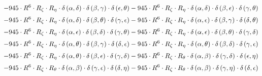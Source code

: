 \begin{subequations}
\begin{gather}
 \\[0.2em] \notag 		 - 945 \cdot R^{6} \cdot R_{\zeta{}} \cdot R_{\eta{}} \cdot \delta{}\left(\alpha{}, \delta{}\right) \cdot \delta{}\left(\beta{}, \gamma{}\right) \cdot \delta{}\left(\epsilon{}, \theta{}\right)- 945 \cdot R^{6} \cdot R_{\zeta{}} \cdot R_{\eta{}} \cdot \delta{}\left(\alpha{}, \delta{}\right) \cdot \delta{}\left(\beta{}, \epsilon{}\right) \cdot \delta{}\left(\gamma{}, \theta{}\right) 
 \\[0.2em] \notag 		 - 945 \cdot R^{6} \cdot R_{\zeta{}} \cdot R_{\eta{}} \cdot \delta{}\left(\alpha{}, \delta{}\right) \cdot \delta{}\left(\beta{}, \theta{}\right) \cdot \delta{}\left(\gamma{}, \epsilon{}\right)- 945 \cdot R^{6} \cdot R_{\zeta{}} \cdot R_{\eta{}} \cdot \delta{}\left(\alpha{}, \epsilon{}\right) \cdot \delta{}\left(\beta{}, \gamma{}\right) \cdot \delta{}\left(\delta{}, \theta{}\right) 
 \\[0.2em] \notag 		 - 945 \cdot R^{6} \cdot R_{\zeta{}} \cdot R_{\eta{}} \cdot \delta{}\left(\alpha{}, \epsilon{}\right) \cdot \delta{}\left(\beta{}, \delta{}\right) \cdot \delta{}\left(\gamma{}, \theta{}\right)- 945 \cdot R^{6} \cdot R_{\zeta{}} \cdot R_{\eta{}} \cdot \delta{}\left(\alpha{}, \epsilon{}\right) \cdot \delta{}\left(\beta{}, \theta{}\right) \cdot \delta{}\left(\gamma{}, \delta{}\right) 
 \\[0.2em] \notag 		 - 945 \cdot R^{6} \cdot R_{\zeta{}} \cdot R_{\eta{}} \cdot \delta{}\left(\alpha{}, \theta{}\right) \cdot \delta{}\left(\beta{}, \gamma{}\right) \cdot \delta{}\left(\delta{}, \epsilon{}\right)- 945 \cdot R^{6} \cdot R_{\zeta{}} \cdot R_{\eta{}} \cdot \delta{}\left(\alpha{}, \theta{}\right) \cdot \delta{}\left(\beta{}, \delta{}\right) \cdot \delta{}\left(\gamma{}, \epsilon{}\right) 
 \\[0.2em] \notag 		 - 945 \cdot R^{6} \cdot R_{\zeta{}} \cdot R_{\eta{}} \cdot \delta{}\left(\alpha{}, \theta{}\right) \cdot \delta{}\left(\beta{}, \epsilon{}\right) \cdot \delta{}\left(\gamma{}, \delta{}\right)- 945 \cdot R^{6} \cdot R_{\zeta{}} \cdot R_{\theta{}} \cdot \delta{}\left(\alpha{}, \beta{}\right) \cdot \delta{}\left(\gamma{}, \delta{}\right) \cdot \delta{}\left(\epsilon{}, \eta{}\right) 
 \\[0.2em] \notag 		 - 945 \cdot R^{6} \cdot R_{\zeta{}} \cdot R_{\theta{}} \cdot \delta{}\left(\alpha{}, \beta{}\right) \cdot \delta{}\left(\gamma{}, \epsilon{}\right) \cdot \delta{}\left(\delta{}, \eta{}\right)- 945 \cdot R^{6} \cdot R_{\zeta{}} \cdot R_{\theta{}} \cdot \delta{}\left(\alpha{}, \beta{}\right) \cdot \delta{}\left(\gamma{}, \eta{}\right) \cdot \delta{}\left(\delta{}, \epsilon{}\right) 

\end{gather}
\end{subequations}

